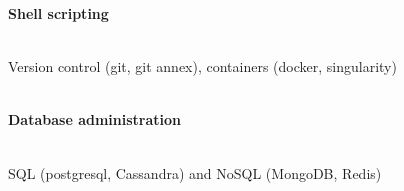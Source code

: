 \documentclass[margin]{res}
\begin{document}
\begin{resume}
\textbf{Shell scripting}\\
\vspace{-2.5em}\\
\begin{adjustwidth}{5mm}{}
Version control (git, git annex), containers (docker, singularity)\\
\end{adjustwidth}
\vspace{-2em}\\

\textbf{Database administration}\\
\vspace{-2.5em}\\
\begin{adjustwidth}{5mm}{}
SQL (postgresql, Cassandra) and NoSQL (MongoDB, Redis)\\
\end{adjustwidth}
\vspace{-2em}\\


\end{resume}
\end{document}
